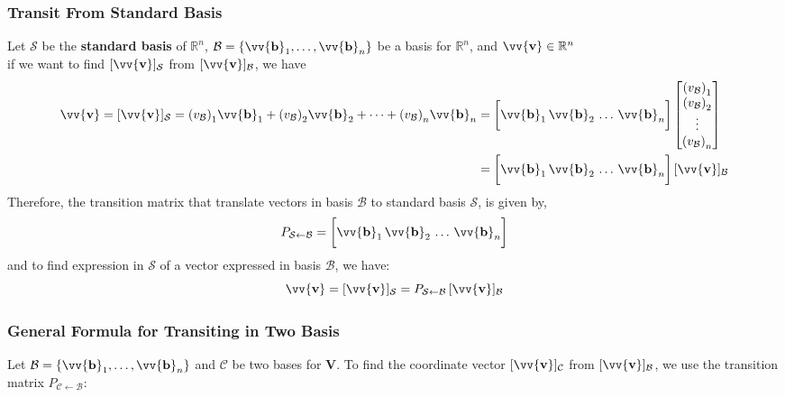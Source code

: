 \documentclass[11pt]{article}
\DeclareRobustCommand{\myvec}[1]{\vv{\mathbf{#1}}}
\newcommand{\mysubvecsp}[1]{\bm{{#1}}}
\newcommand{\myset}[1]{\mathcal{#1}}
\newcommand{\mymat}[1]{#1}
\begin{document}
    \subsubsection{Transit From Standard Basis}
    Let $\myset{S}$ be the \textbf{standard basis} of $\mathbb{R}^n$, $\myset{B} = \{\myvec{b}_1, \dots, \myvec{b}_n\}$ be a basis for $\mathbb{R}^n$, and $\myvec{v} \in \mathbb{R}^n$\\
    if we want to find $[\myvec{v}]_\myset{S}$ from $[\myvec{v}]_\myset{B}$, we have
    \begin{align*}
    \myvec{v} = [\myvec{v}]_{\myset{S}} = {(v_\myset{B})}_1\myvec{b}_1 + {(v_\myset{B})}_2\myvec{b}_2 + \dots + {(v_\myset{B})}_n\myvec{b}_n 
        & = \bigg[ \myvec{b}_1 \, \myvec{b}_2 \, \dots \, \myvec{b}_n \bigg] 
        \begin{bmatrix} {(v_\myset{B})}_1 \\ {(v_\myset{B})}_2 \\ \vdots \\ {(v_\myset{B})}_n \end{bmatrix} \\
        & = \bigg[ \myvec{b}_1 \, \myvec{b}_2 \, \dots \, \myvec{b}_n \bigg]\,[\myvec{v}]_\myset{B}
    \end{align*}
    Therefore, the transition matrix that translate vectors in basis $\myset{B}$ to standard basis $\myset{S}$, is given by,
    \begin{equation}
        \mymat{P}_{\myset{S}\leftarrow\myset{B}} = \bigg[ \myvec{b}_1 \, \myvec{b}_2 \, \dots \, \myvec{b}_n \bigg]
    \end{equation} 
    and to find expression in $\myset{S}$ of a vector expressed in basis $\myset{B}$, we have:
    \begin{equation}
        \myvec{v} = [\myvec{v}]_{\myset{S}} = \mymat{P}_{\myset{S}\leftarrow\myset{B}} \, [\myvec{v}]_{\myset{B}}
    \end{equation}
        
    

    \subsubsection{General Formula for Transiting in Two Basis}

    Let $\myset{B} = \{\myvec{b}_1, \dots, \myvec{b}_n\}$ and $\myset{C}$ be two bases for $\mysubvecsp{V}$. To find the coordinate vector $[\myvec{v}]_{\myset{C}}$ from $[\myvec{v}]_{\myset{B}}$, we use the transition matrix $\mymat{P}_{\myset{C} \leftarrow \myset{B}}$:
\end{document}
